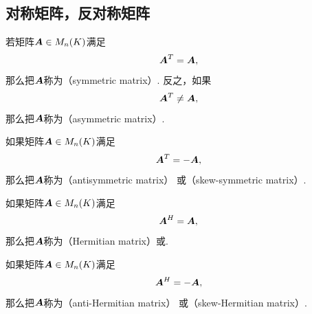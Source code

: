 \subsection{对称矩阵，反对称矩阵}
\begin{definition}
若矩阵\(\boldsymbol{A} \in M_n(K)\)满足\begin{equation*}
    \boldsymbol{A}^T = \boldsymbol{A},
\end{equation*}
那么把\(\boldsymbol{A}\)称为（symmetric matrix）.
反之，如果\begin{equation*}
	\boldsymbol{A}^T \neq \boldsymbol{A},
\end{equation*}
那么把\(\boldsymbol{A}\)称为（asymmetric matrix）.
\end{definition}

\begin{definition}
如果矩阵\(\boldsymbol{A} \in M_n(K)\)满足\begin{equation*}
	\boldsymbol{A}^T = -\boldsymbol{A},
\end{equation*}
那么把\(\boldsymbol{A}\)称为（antisymmetric matrix）
或（skew-symmetric matrix）.
\end{definition}

\begin{definition}
如果矩阵\(\boldsymbol{A} \in M_n(K)\)满足\begin{equation*}
    \boldsymbol{A}^H = \boldsymbol{A},
\end{equation*}
那么把\(\boldsymbol{A}\)称为（Hermitian matrix）或.
\end{definition}

\begin{definition}
如果矩阵\(\boldsymbol{A} \in M_n(K)\)满足\begin{equation*}
	\boldsymbol{A}^H = -\boldsymbol{A},
\end{equation*}
那么把\(\boldsymbol{A}\)称为（anti-Hermitian matrix）
或（skew-Hermitian matrix）.
\end{definition}

